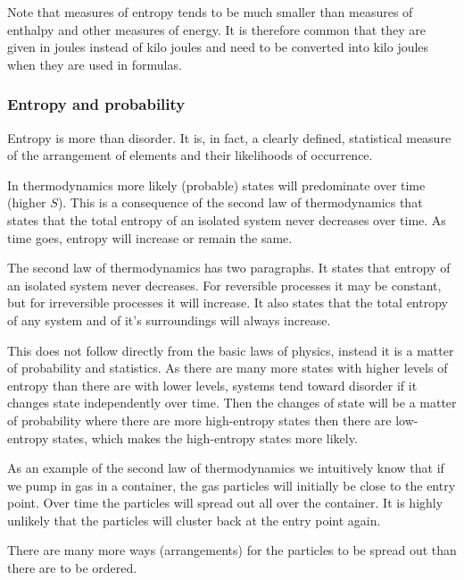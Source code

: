 \documentclass[../mit-general-chemistry.tex]{subfiles}
\begin{document}
\begin{remark}
  Note that measures of entropy tends to be much smaller than measures
  of enthalpy and other measures of energy. It is therefore common
  that they are given in joules instead of kilo joules and need to be
  converted into kilo joules when they are used in formulas. 
\end{remark}





\subsubsection{Entropy and probability}



Entropy is more than disorder. It is, in fact, a clearly defined,
statistical measure of the arrangement of elements and their
likelihoods of occurrence.

In thermodynamics more likely (probable) states will predominate over
time (higher $S$). This is a consequence of the second law of
thermodynamics that states that the total entropy of an isolated
system never decreases over time. As time goes, entropy will increase
or remain the same.

The second law of thermodynamics has two paragraphs. It states that
entropy of an isolated system never decreases. For reversible
processes it may be constant, but for irreversible processes it will
increase. It also states that the total entropy of any system and of
it's surroundings will always increase.


This does not follow directly from the basic laws of physics, instead
it is a matter of probability and statistics. As there are many more
states with higher levels of entropy than there are with lower levels,
systems tend toward disorder if it changes state independently over
time. Then the changes of state will be a matter of probability where
there are more high-entropy states then there are low-entropy states,
which makes the high-entropy states more likely.


As an example of the second law of thermodynamics we intuitively know
that if we pump in gas in a container, the gas particles will
initially be close to the entry point. Over time the particles will
spread out all over the container. It is highly unlikely that the
particles will cluster back at the entry point again.


There are many more ways (arrangements) for the particles to be spread
out than there are to be ordered.
\end{document}
